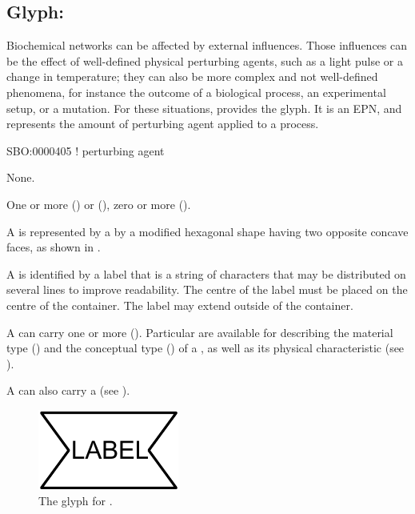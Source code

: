 
\subsection{Glyph: }
\label{sec:perturbing agent}

Biochemical networks can be affected by external influences.
Those influences can be the effect of well-defined physical perturbing agents, such as a light pulse or a change in temperature; they can also be more complex and not well-defined phenomena, for instance the outcome of a biological process, an experimental setup, or a mutation.
For these situations, \PD provides the  glyph. It is an EPN, and represents the amount of perturbing agent applied to a process.

\begin{glyphDescription}

\glyphSboTerm
SBO:0000405 ! perturbing agent


\glyphIncoming
None.



\glyphOutgoing
One or more  () or  (), zero or more  ().


\glyphContainer
A  is represented by a by a modified hexagonal shape having two opposite concave faces, as shown in .

\glyphLabel
A  is identified by a label that is  a string of characters that may be distributed on several lines to improve readability.
The centre of the label must be placed on the centre of the container.
The label may extend outside of the container.

\glyphAux
A  can carry one or more  ().
Particular  are available for describing the material type () and the conceptual type () of a , as well as its physical characteristic (see ).

A  can also carry a  (see ).

\end{glyphDescription}

\begin{figure}[H]
  \centering
  \includegraphics{images/perturbing_agent}
  \caption{The \PD glyph for .}
  \label{fig:perturbing_agent}
\end{figure}


